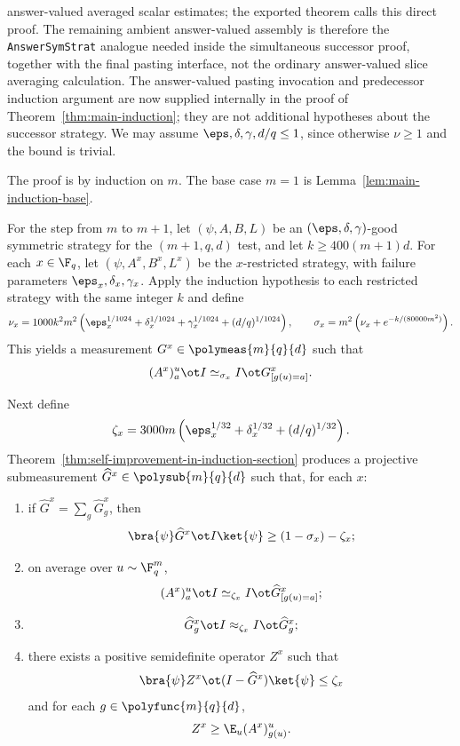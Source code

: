 	answer-valued averaged scalar estimates; the exported theorem
	calls this direct proof.
	The remaining ambient answer-valued assembly is therefore the
	\texttt{AnswerSymStrat} analogue needed inside the simultaneous successor
	proof, together with the final pasting interface, not the ordinary
	answer-valued slice averaging calculation.
	The answer-valued pasting invocation and predecessor induction argument are
	now supplied internally in the proof of Theorem~\ref{thm:main-induction};
	they are not additional hypotheses about the successor strategy.
	We may assume $\eps,\delta,\gamma,d/q \le 1$, since otherwise $\nu \ge 1$ and the bound is trivial.

	The proof is by induction on $m$. The base case $m=1$ is Lemma~\ref{lem:main-induction-base}.

	For the step from $m$ to $m+1$, let $(\psi,A,B,L)$ be an $(\eps,\delta,\gamma)$-good symmetric strategy for the $(m+1,q,d)$ test, and let $k \ge 400(m+1)d$. For each $x \in \F_q$, let $(\psi,A^x,B^x,L^x)$ be the $x$-restricted strategy, with failure parameters $\eps_x,\delta_x,\gamma_x$. Apply the induction hypothesis to each restricted strategy with the same integer $k$ and define
	\[
		\nu_x = 1000k^2m^2\left(\eps_x^{1/1024}+\delta_x^{1/1024}+\gamma_x^{1/1024}+(d/q)^{1/1024}\right),
		\qquad
		\sigma_x = m^2\left(\nu_x + e^{-k/(80000m^2)}\right).
	\]
	This yields a measurement $G^x \in \polymeas{m}{q}{d}$ such that
	\[
		(A^x)_a^u \ot I \simeq_{\sigma_x} I \ot G_{[g(u)=a]}^x.
	\]

	Next define
	\[
		\zeta_x = 3000m\left(\eps_x^{1/32}+\delta_x^{1/32}+(d/q)^{1/32}\right).
	\]
	Theorem~\ref{thm:self-improvement-in-induction-section} produces a projective submeasurement $\widehat G^x \in \polysub{m}{q}{d}$ such that, for each $x$:
	\begin{enumerate}
		\item if $\widehat G^x=\sum_g \widehat G_g^x$, then
		      \[
			      \bra{\psi} \widehat G^x \ot I \ket{\psi} \ge (1-\sigma_x)-\zeta_x;
		      \]
		\item on average over $u \sim \F_q^m$,
		      \[
			      (A^x)_a^u \ot I \simeq_{\zeta_x} I \ot \widehat G_{[g(u)=a]}^x;
		      \]
		\item
		      \[
			      \widehat G_g^x \ot I \approx_{\zeta_x} I \ot \widehat G_g^x;
		      \]
		\item there exists a positive semidefinite operator $Z^x$ such that
		      \[
			      \bra{\psi} Z^x \ot (I-\widehat G^x) \ket{\psi} \le \zeta_x
		      \]
		      and for each $g \in \polyfunc{m}{q}{d}$,
		      \[
			      Z^x \ge \E_u (A^x)_{g(u)}^u.
		      \]
	\end{enumerate}

